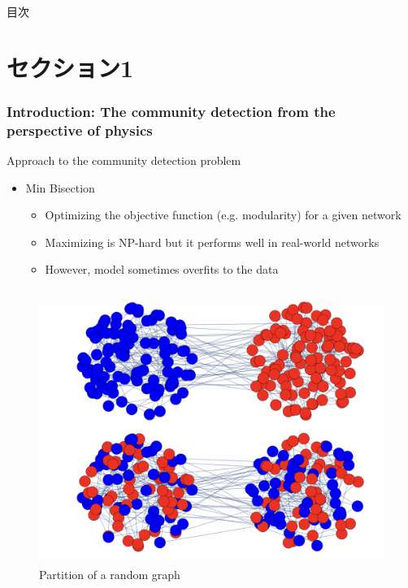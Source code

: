 \documentclass[dvipdfmx,11pt]{beamer}
\title{}
\author{}
\date{\today}
\institute{所属機関}
\begin{document}
\maketitle

\begin{frame}{目次}
  \tableofcontents
\end{frame}


\section{セクション1}

\begin{frame}
  \frametitle{Introduction: The community detection from the perspective of physics}

  Approach to the community detection problem
  \begin{itemize}
    \item Min Bisection
    \begin{itemize}
      \item Optimizing the objective function (e.g. modularity) for a given network
      \item Maximizing is NP-hard but it performs well in real-world networks
      \item However, model sometimes overfits to the data 
    \end{itemize}

  \end{itemize}

    \begin{columns}
      \begin{column}{0.4\textwidth}
        \begin{figure}
          \centering
          \includegraphics[width=0.8\linewidth]{figure/overfit.png}
          \caption{Partition of a random graph}
        \end{figure}
      \end{column}
  

\end{columns}
\end{frame}
\end{document}
